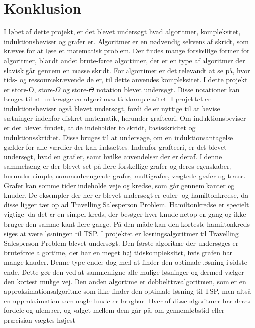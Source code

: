 \chapter{Konklusion}


I løbet af dette projekt, er det blevet undersøgt hvad algoritmer, kompleksitet, induktionsbeviser og grafer er. 
Algoritmer er en nødvendig sekvens af skridt, som kræves for at løse et matematisk problem. 
Der findes mange forskellige former for algoritmer, blandt andet brute-force algortimer, der er en type af algoritmer der slavisk går gennem en masse skridt. 
For algortimer er det relevandt at se på, hvor tids- og ressourcekrævende de er, til dette anvendes kompleksitet. 
I dette projekt er store-O, store-$\Omega$ og store-$\Theta$ notation blevet undersøgt. 
Disse notationer kan bruges til at undersøge en algoritmes tidskompleksitet. 
I projektet er induktionsbeviser også blevet undersøgt, fordi de er nyttige til at bevise sætninger indenfor diskret matematik, herunder grafteori. 
Om induktionsbeviser er det blevet fundet, at de indeholder to skridt, basisskridtet og induktionsskridtet.
Disse bruges til at undersøge, om en induktionsantagelse gælder for alle værdier der kan indsættes. 
Indenfor grafteori, er det blevet undersøgt, hvad en graf er, samt hvilke anvendelser der er deraf. 
I denne sammehæng er der blevet set på flere forskellige grafer og deres egenskaber, herunder  simple, sammenhængende grafer, multigrafer, vægtede grafer og træer. 
Grafer kan somme tider indeholde veje og kredse, som går gennem kanter og knuder. 
De eksempler der her er blevet undersøgt er euler- og hamiltonkredse, da disse ligger tæt op ad Travelling Salesperson Problem. 
Hamiltonkredse er specielt vigtige, da det er en simpel kreds, der besøger hver knude netop en gang og ikke bruger den samme kant flere gange.
På den måde kan den korteste hamiltonkreds siges at være løsningen til TSP. 
I projektet er løsningsalgoritmer til Travelling Salesperson Problem blevet undersøgt. 
Den første algoritme der undersøges er bruteforce algortime, der har en meget høj tidskompleksitet, hvis grafen har mange knuder. Denne type ender dog med at finder den optimale løsning i sidste ende. Dette gør den ved at sammenligne alle mulige løsninger og dermed vælger den kortest mulige vej.  
Den anden algortime er dobbelttræalgoritmen, som er en approksimationsalgoritme som ikke finder den optimale løsning til TSP, men altså en approksimation som nogle lunde er brugbar. 
Hver af disse algoritmer har deres fordele og ulemper, og valget mellem dem går på, om gennemløbstid eller præcision vægtes højest. 
